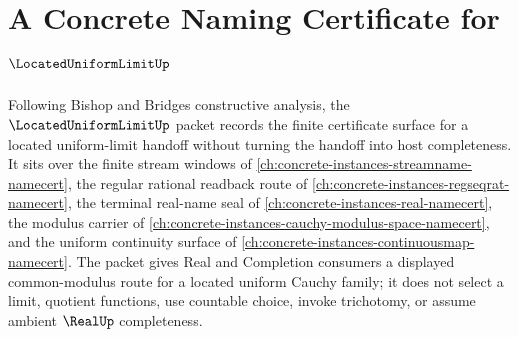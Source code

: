 \chapter{A Concrete Naming Certificate for $\LocatedUniformLimitUp$}
\label{ch:concrete-instances-located-uniform-limit-namecert}

Following Bishop and Bridges constructive analysis, the
$\LocatedUniformLimitUp$ packet records the finite certificate surface for a
located uniform-limit handoff without turning the handoff into host
completeness. It sits over the finite stream windows of
\autoref{ch:concrete-instances-streamname-namecert}, the regular rational
readback route of \autoref{ch:concrete-instances-regseqrat-namecert}, the
terminal real-name seal of \autoref{ch:concrete-instances-real-namecert}, the
modulus carrier of \autoref{ch:concrete-instances-cauchy-modulus-space-namecert},
and the uniform continuity surface of
\autoref{ch:concrete-instances-continuousmap-namecert}. The packet gives Real
and Completion consumers a displayed common-modulus route for a located
uniform Cauchy family; it does not select a limit, quotient functions, use
countable choice, invoke trichotomy, or assume ambient $\RealUp$ completeness.

